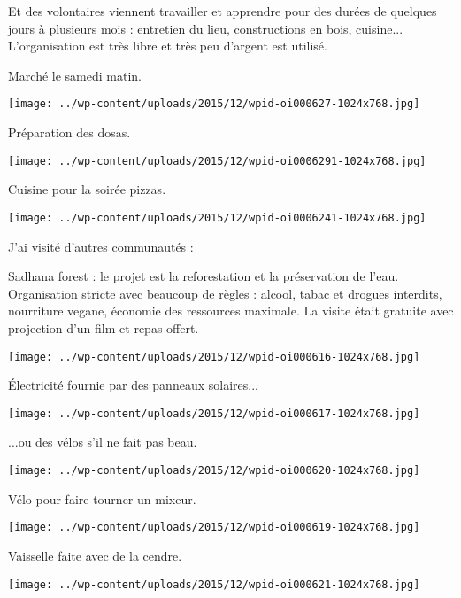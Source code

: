  Et des volontaires viennent travailler et apprendre pour des durées de quelques jours à plusieurs mois : entretien du lieu, constructions en bois, cuisine... L'organisation est très libre et très peu d'argent est utilisé. 

 Marché le samedi matin. 
\begin{center} \texttt{[image: ../wp-content/uploads/2015/12/wpid-oi000627-1024x768.jpg]} \end{center}

\pagebreak
 Préparation des dosas. 
\begin{center} \texttt{[image: ../wp-content/uploads/2015/12/wpid-oi0006291-1024x768.jpg]} \end{center}

  Cuisine pour la soirée pizzas. 
\begin{center} \texttt{[image: ../wp-content/uploads/2015/12/wpid-oi0006241-1024x768.jpg]} \end{center}

  J'ai visité d'autres communautés : 

 Sadhana forest : le projet est la reforestation et la préservation de l'eau. Organisation stricte avec beaucoup de règles : alcool, tabac et drogues interdits, nourriture vegane, économie des ressources maximale. La visite était gratuite avec projection d'un film et repas offert. 
\begin{center} \texttt{[image: ../wp-content/uploads/2015/12/wpid-oi000616-1024x768.jpg]} \end{center}

 Électricité fournie par des panneaux solaires...
\begin{center} \texttt{[image: ../wp-content/uploads/2015/12/wpid-oi000617-1024x768.jpg]} \end{center}

\pagebreak
 ...ou des vélos s'il ne fait pas beau. 
\begin{center} \texttt{[image: ../wp-content/uploads/2015/12/wpid-oi000620-1024x768.jpg]} \end{center}

 Vélo pour faire tourner un mixeur. 
\begin{center} \texttt{[image: ../wp-content/uploads/2015/12/wpid-oi000619-1024x768.jpg]} \end{center}

\pagebreak
 Vaisselle faite avec de la cendre. 
\begin{center} \texttt{[image: ../wp-content/uploads/2015/12/wpid-oi000621-1024x768.jpg]} \end{center}

